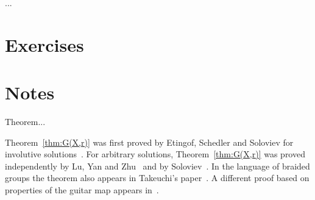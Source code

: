 \begin{example}
...
\end{example}

\section*{Exercises}

\section*{Notes}

Theorem...

Theorem~\ref{thm:G(X,r)} 
was first proved by Etingof, Schedler and Soloviev for involutive solutions~\cite{MR1722951}. For arbitrary 
solutions, Theorem~\ref{thm:G(X,r)} was proved 
independently by Lu, Yan and Zhu~\cite{MR1769723} and by Soloviev~\cite{MR1809284}. 
In the language of braided groups the theorem also appears
in Takeuchi's paper~\cite{MR2024436}. A different proof based on properties of the guitar map appears
in~\cite{MR3558231}. 
